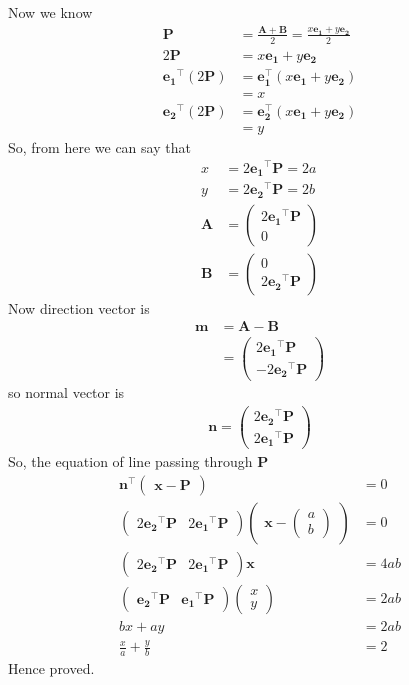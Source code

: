 \documentclass[12pt]{article}
\providecommand{\brak}[1]{\ensuremath{\left(#1\right)}}
\newcommand{\myvec}[1]{\ensuremath{\begin{pmatrix}#1\end{pmatrix}}}
\let\vec\mathbf
\begin{document}
Now we know
\begin{align}
	\vec{P}&=\frac{\vec{A}+\vec{B}}{2}=\frac{x\vec{e_{1}}+y\vec{e_{2}}}{2}\\
	2\vec{P}&=x\vec{e_{1}}+y\vec{e_{2}}\\
	\vec{e_{1}}^{\top}\brak{2\vec{P}}&=\vec{e_{1}^{\top}}\brak{x\vec{e_{1}}+y\vec{e_{2}}}\\
					 &=x\\				 
	\vec{e_{2}}^{\top}\brak{2\vec{P}}&=\vec{e_{2}^{\top}}\brak{x\vec{e_{1}}+y\vec{e_{2}}}\\
					 &=y				 
\end{align}
So, from here we can say that
\begin{align}
	x&=2\vec{e_{1}}^{\top}\vec{P}=2a\\
	y&=2\vec{e_{2}}^{\top}\vec{P}=2b\\
	\vec{A} &= \myvec{2\vec{e_{1}}^{\top}\vec{P}\\0}\\
	\vec{B} &= \myvec{0\\2\vec{e_{2}}^{\top}\vec{P}}
\end{align}
Now direction vector is
\begin{align}
	\vec{m} &= \vec{A}-\vec{B}\\
		&= \myvec{2\vec{e_{1}}^{\top}\vec{P}\\-2\vec{e_{2}}^{\top}\vec{P}}
\end{align}
so normal vector is
\begin{align}
	\vec{n} = \myvec{2\vec{e_{2}}^{\top}\vec{P}\\2\vec{e_{1}}^{\top}\vec{P}}
\end{align}
So, the equation of line passing through $\vec{P}$
\begin{align}
	\vec{n}^{\top} \myvec{\vec{x}-\vec{P}} &= 0\\
	\myvec{2\vec{e_{2}}^{\top}\vec{P} & 2\vec{e_{1}}^{\top}\vec{P}}\myvec{\vec{x}-\myvec{a\\b}}&=0\\
	\myvec{2\vec{e_{2}}^{\top}\vec{P} & 2\vec{e_{1}}^{\top}\vec{P}}\vec{x}&=4ab\\
	\myvec{\vec{e_{2}}^{\top}\vec{P} & \vec{e_{1}}^{\top}\vec{P}}\myvec{x\\y}&=2ab\\
	bx+ay&=2ab\\
	\frac{x}{a}+\frac{y}{b}&=2
\end{align}
Hence proved.
\end{document}
